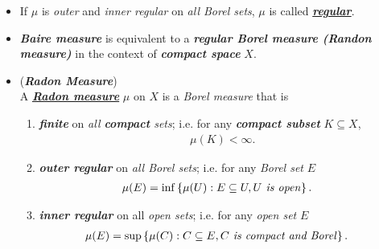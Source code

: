 \documentclass[11pt]{article}
\begin{document}
\begin{itemize}
\item \begin{definition}
If $\mu$ is \emph{outer} and \emph{inner regular} on \emph{all Borel sets}, $\mu$ is called \underline{\textbf{\emph{regular}}}. 
\end{definition}

\item \begin{remark}
\emph{\textbf{Baire measure}} is equivalent to a \emph{\textbf{regular Borel measure (Randon measure)}} in the context of \emph{\textbf{compact space}} $X$.
\end{remark}

\item \begin{definition} (\emph{\textbf{Radon Measure}}) \citep{folland2013real} \\
A \underline{\textbf{\emph{Radon measure}}} $\mu$ on $X$ is a \emph{Borel measure} that is 
\begin{enumerate}
\item \emph{\textbf{finite}} on \emph{all \textbf{compact} sets}; i.e. for any \emph{\textbf{compact subset}} $K \subseteq X$, 
\begin{align*}
\mu(K) < \infty.
\end{align*}
\item \emph{\textbf{outer regular}} on \emph{all Borel sets}; i.e. for any \emph{Borel set} $E$ 
\begin{align*}
\mu(E) &= \inf\left\{\mu(U): E \subseteq U, U \text{\emph{ is open}}\right\}.
\end{align*}
\item  \emph{\textbf{inner regular}} on all \emph{open sets}; i.e. for any \emph{open set} $E$
\begin{align*}
\mu(E) &= \sup\left\{\mu(C): C \subseteq E, C \text{\emph{ is compact and Borel}}\right\}.
\end{align*}
\end{enumerate}
\end{definition}

\end{itemize}
\end{document}
